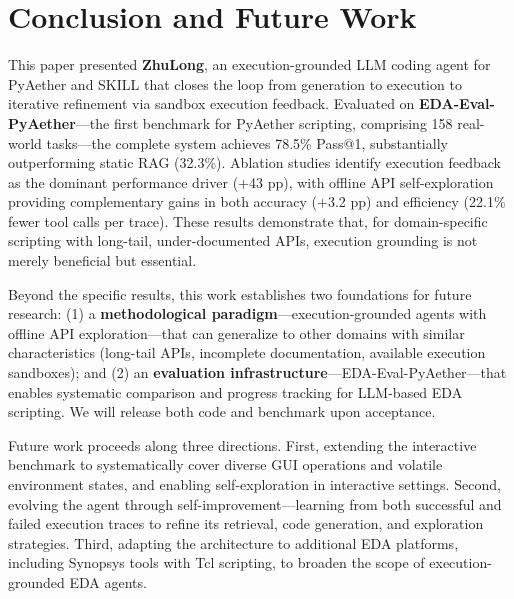 \section{Conclusion and Future Work}
\label{sec:conclusion}

This paper presented \textbf{ZhuLong}, an execution-grounded LLM coding agent for PyAether and SKILL that closes the loop from generation to execution to iterative refinement via sandbox execution feedback. Evaluated on \textbf{EDA-Eval-PyAether}—the first benchmark for PyAether scripting, comprising 158 real-world tasks—the complete system achieves 78.5\% Pass@1, substantially outperforming static RAG (32.3\%). Ablation studies identify execution feedback as the dominant performance driver (+43 pp), with offline API self-exploration providing complementary gains in both accuracy (+3.2 pp) and efficiency (22.1\% fewer tool calls per trace). These results demonstrate that, for domain-specific scripting with long-tail, under-documented APIs, execution grounding is not merely beneficial but essential.

Beyond the specific results, this work establishes two foundations for future research: (1) a \textbf{methodological paradigm}—execution-grounded agents with offline API exploration—that can generalize to other domains with similar characteristics (long-tail APIs, incomplete documentation, available execution sandboxes); and (2) an \textbf{evaluation infrastructure}—EDA-Eval-PyAether—that enables systematic comparison and progress tracking for LLM-based EDA scripting. We will release both code and benchmark upon acceptance.


Future work proceeds along three directions. First, extending the interactive benchmark to systematically cover diverse GUI operations and volatile environment states, and enabling self-exploration in interactive settings. Second, evolving the agent through self-improvement—learning from both successful and failed execution traces to refine its retrieval, code generation, and exploration strategies. Third, adapting the architecture to additional EDA platforms, including Synopsys tools with Tcl scripting, to broaden the scope of execution-grounded EDA agents.

